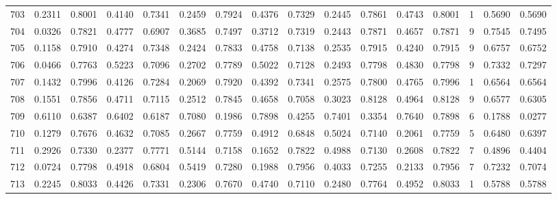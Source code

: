\begin{tabular}{lrrrrrrrrrrrrrrr}
703 &      0.2311 &  0.8001 &  0.4140 &  0.7341 &  0.2459 &  0.7924 &  0.4376 &  0.7329 &  0.2445 &  0.7861 &   0.4743 &     0.8001 &      1 &                    0.5690 &                     0.5690 \\
704 &      0.0326 &  0.7821 &  0.4777 &  0.6907 &  0.3685 &  0.7497 &  0.3712 &  0.7319 &  0.2443 &  0.7871 &   0.4657 &     0.7871 &      9 &                    0.7545 &                     0.7495 \\
705 &      0.1158 &  0.7910 &  0.4274 &  0.7348 &  0.2424 &  0.7833 &  0.4758 &  0.7138 &  0.2535 &  0.7915 &   0.4240 &     0.7915 &      9 &                    0.6757 &                     0.6752 \\
706 &      0.0466 &  0.7763 &  0.5223 &  0.7096 &  0.2702 &  0.7789 &  0.5022 &  0.7128 &  0.2493 &  0.7798 &   0.4830 &     0.7798 &      9 &                    0.7332 &                     0.7297 \\
707 &      0.1432 &  0.7996 &  0.4126 &  0.7284 &  0.2069 &  0.7920 &  0.4392 &  0.7341 &  0.2575 &  0.7800 &   0.4765 &     0.7996 &      1 &                    0.6564 &                     0.6564 \\
708 &      0.1551 &  0.7856 &  0.4711 &  0.7115 &  0.2512 &  0.7845 &  0.4658 &  0.7058 &  0.3023 &  0.8128 &   0.4964 &     0.8128 &      9 &                    0.6577 &                     0.6305 \\
709 &      0.6110 &  0.6387 &  0.6402 &  0.6187 &  0.7080 &  0.1986 &  0.7898 &  0.4255 &  0.7401 &  0.3354 &   0.7640 &     0.7898 &      6 &                    0.1788 &                     0.0277 \\
710 &      0.1279 &  0.7676 &  0.4632 &  0.7085 &  0.2667 &  0.7759 &  0.4912 &  0.6848 &  0.5024 &  0.7140 &   0.2061 &     0.7759 &      5 &                    0.6480 &                     0.6397 \\
711 &      0.2926 &  0.7330 &  0.2377 &  0.7771 &  0.5144 &  0.7158 &  0.1652 &  0.7822 &  0.4988 &  0.7130 &   0.2608 &     0.7822 &      7 &                    0.4896 &                     0.4404 \\
712 &      0.0724 &  0.7798 &  0.4918 &  0.6804 &  0.5419 &  0.7280 &  0.1988 &  0.7956 &  0.4033 &  0.7255 &   0.2133 &     0.7956 &      7 &                    0.7232 &                     0.7074 \\
713 &      0.2245 &  0.8033 &  0.4426 &  0.7331 &  0.2306 &  0.7670 &  0.4740 &  0.7110 &  0.2480 &  0.7764 &   0.4952 &     0.8033 &      1 &                    0.5788 &                     0.5788 \\

\end{tabular}
